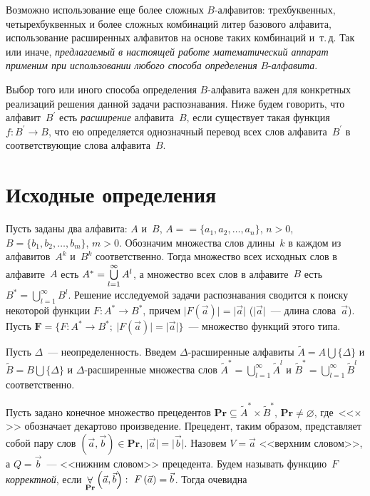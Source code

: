 \begin{multicols}{2}
    Возможно использование еще более сложных $B$-ал\-фа\-ви\-тов: 
трехбуквенных, четырехбуквенных и более сложных комбинаций литер 
базового алфавита, использование расширенных алфавитов на основе таких 
комбинаций и~т.\,д. Так или иначе, \textit{предлагаемый в настоящей работе 
математический аппарат применим при использовании любого способа 
определения} $B$-\textit{ал\-фа\-вита}. 

    Выбор того или иного способа определения $B$-ал\-фа\-ви\-та важен для 
конкретных реализаций решения данной задачи распознавания. Ниже будем 
говорить, что алфавит~$B^\prime$ есть \textit{расширение} алфавита~$B$, если 
существует такая функция $f: B^\prime\rightarrow B$, что ею определяется 
однозначный перевод всех слов алфавита~$B^\prime$ в соответствующие слова 
ал\-фа\-ви\-та~$B$.


\section{Исходные определения}

Пусть заданы два алфавита: $A$ и~$B$, $A =$\linebreak $= \{a_1, a_2, \ldots , a_n\}$, $n > 0$, 
$B = \{b_1, b_2, \ldots , b_m\}$, $m > 0$. Обозначим множества слов длины~$k$ в 
каждом из алфавитов~$A^k$ и~$B^k$ соответственно. Тогда множество всех 
исходных слов в алфавите~$A$ есть $A^* =\bigcup\protect\limits_{l=1}^\infty A^l$, а 
множество всех слов в алфавите~$B$ есть $B^*=\bigcup\limits_{l=1}^\infty B^l$. 
Решение исследуемой задачи распознавания сводится к поиску некоторой 
функции $F: A^* \rightarrow B^*$, причем $\vert F(\vec{a})\vert =\vert 
\vec{a}\vert$ ($\vert\vec{a}\vert$~--- длина слова~$\vec{a}$). Пусть $\mathbf{F} 
= \{F: A^*\rightarrow B^*;\ \vert F (\vec{a})\vert =\vert\vec{a}\vert\}$~--- 
множество функций этого типа.

    Пусть $\Delta$~--- неопределенность. Введем $\Delta$-рас\-ши\-рен\-ные 
алфавиты $\tilde{A}=A\bigcup\{\Delta\}$ и $\tilde{B}=B\bigcup\{\Delta\}$ и 
$\Delta$-рас\-ши\-рен\-ные множества слов $\tilde{A}^*=\bigcup\limits_{l=1}^\infty 
\tilde{A}^l$ и  $\tilde{B}^*=\bigcup\limits_{l=1}^\infty \tilde{B}^l$ соответственно. 

Пусть задано конечное множество прецедентов $\mathbf{Pr}\subseteq 
\tilde{A}^*\times \tilde{B}^*$, $\mathbf{Pr}\not= \varnothing$, где~<<$\times$>> 
обозначает декартово произведение. Прецедент, таким образом, представляет 
собой пару слов $\left(\vec{a},\vec{b}\right) \in \mathbf{Pr}$, $\vert\vec{a}\vert 
=\vert\vec{b}\vert$. Назовем $V=\vec{a}$ <<верхним словом>>, а 
$Q=\vec{b}$~--- <<нижним словом>> прецедента. Будем называть 
функцию~$F$ \textit{корректной}, если $\mathop{\forall}\limits_{\mathbf{Pr}} 
\left(\vec{a},\vec{b}\right) :\ F\left(\vec{a}\right)=\vec{b}$. Тогда оче\-видна 


\end{multicols}
